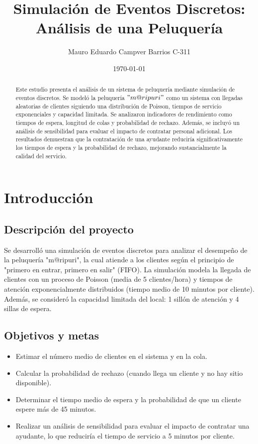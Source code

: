\documentclass[12pt,a4paper]{article}
\title{\Large{\textbf{Simulación de Eventos Discretos: Análisis de una Peluquería}}}
\author{Mauro Eduardo Campver Barrios C-311}
\date{\today}
\begin{document}
\maketitle

\begin{abstract}
Este estudio presenta el análisis de un sistema de peluquería mediante simulación de eventos discretos. Se modeló la peluquería $"m@ripuri"$ como un sistema con llegadas aleatorias de clientes siguiendo una distribución de Poisson, tiempos de servicio exponenciales y capacidad limitada. Se analizaron indicadores de rendimiento como tiempos de espera, longitud de colas y probabilidad de rechazo. Además, se incluyó un análisis de sensibilidad para evaluar el impacto de contratar personal adicional. Los resultados demuestran que la contratación de una ayudante reduciría significativamente los tiempos de espera y la probabilidad de rechazo, mejorando sustancialmente la calidad del servicio.
\end{abstract}

\section{Introducción}

\subsection{Descripción del proyecto}
Se desarrolló una simulación de eventos discretos para analizar el desempeño de la peluquería "m@ripuri", la cual atiende a los clientes según el principio de "primero en entrar, primero en salir" (FIFO). La simulación modela la llegada de clientes con un proceso de Poisson (media de 5 clientes/hora) y tiempos de atención exponencialmente distribuidos (tiempo medio de 10 minutos por cliente). Además, se consideró la capacidad limitada del local: 1 sillón de atención y 4 sillas de espera.

\subsection{Objetivos y metas}

\begin{itemize}
    \item Estimar el número medio de clientes en el sistema y en la cola.
    \item Calcular la probabilidad de rechazo (cuando llega un cliente y no hay sitio disponible).
    \item Determinar el tiempo medio de espera y la probabilidad de que un cliente espere más de 45 minutos.
    \item Realizar un análisis de sensibilidad para evaluar el impacto de contratar una ayudante, lo que reduciría el tiempo de servicio a 5 minutos por cliente.
\end{itemize}
\end{document}
